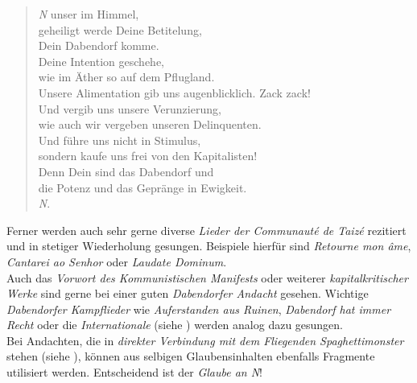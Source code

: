 \clearpage
\begin{verse}
\begin{small}
\textit{N} unser im Himmel,\\
geheiligt werde Deine Betitelung,\\
Dein Dabendorf komme.\\
Deine Intention geschehe,\\
wie im Äther so auf dem Pflugland.\\
Unsere Alimentation gib uns augenblicklich. Zack zack!\\
Und vergib uns unsere Verunzierung,\\
wie auch wir vergeben unseren Delinquenten.\\
Und führe uns nicht in Stimulus,\\
sondern kaufe uns frei von den Kapitalisten!\\
Denn Dein sind das Dabendorf und\\
die Potenz und das Gepränge in Ewigkeit.\\
\textit{N}.
\end{small}
\end{verse}

\noindent Ferner werden auch sehr gerne diverse \textit{Lieder der Communauté de Taizé} rezitiert und in stetiger Wiederholung gesungen. Beispiele hierfür sind \textit{Retourne mon âme}, \textit{Cantarei ao Senhor} oder \textit{Laudate Dominum}.\\
Auch das \textit{Vorwort des Kommunistischen Manifests} oder weiterer \textit{kapitalkritischer Werke} sind gerne bei einer guten \textit{Dabendorfer Andacht} gesehen. Wichtige \textit{Dabendorfer Kampflieder} wie \textit{Auferstanden aus Ruinen}, \textit{Dabendorf hat immer Recht} oder die \textit{Internationale} (siehe ) werden analog dazu gesungen.\\
Bei Andachten, die in \textit{direkter Verbindung mit dem Fliegenden Spaghettimonster} stehen (siehe ), können aus selbigen Glaubensinhalten ebenfalls Fragmente utilisiert werden. Entscheidend ist der \textit{Glaube an N}!

